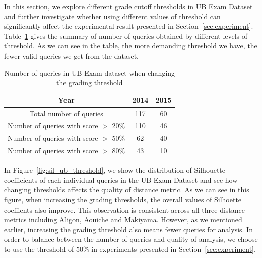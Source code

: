 In this section, we explore different grade cutoff thresholds in UB Exam Dataset and further investigate whether using different values of threshold can significantly affect the experimental result presented in Section~\ref{sec:experiment}. Table~\ref{tab:grading_threshold} gives the summary of number of queries obtained by different levels of threshold. As we can see in the table, the more demanding threshold we have, the fewer valid queries we get from the dataset. 

\begin{table}[h]
\begin{center}
\begin{tabular}{ c c c}
\toprule
	Year & 2014 & 2015\\ \midrule
	Total number of queries & 117 & 60 \\
	Number of queries with score $>$ 20\% & 110 & 46\\ 
	Number of queries with score $>$ 50\% & 62 & 40\\ 
	Number of queries with score $>$ 80\% & 43 & 10\\ 
	\bottomrule
\end{tabular}
\end{center}
\vspace{-2mm}
\caption{Number of queries in UB Exam dataset when changing the grading threshold} 
\label{tab:grading_threshold} 
\end{table}



In Figure~\ref{fig:sil_ub_threshold}, we show the distribution of Silhouette coefficients of each individual queries in the UB Exam Dataset and see how changing thresholds affects the quality of distance metric. As we can see in this figure, when increasing the grading thresholds, the overall values of Silhoette coeffients also improve. This observation is consistent across all three distance metrics including Aligon, Aouiche and Makiyama. However, as we mentioned earlier, increasing the grading threshold also means fewer queries for analysis. In order to balance between the number of queries and quality of analysis, we choose to use the threshold of $50\%$ in experiments presented in Section~\ref{sec:experiment}.



